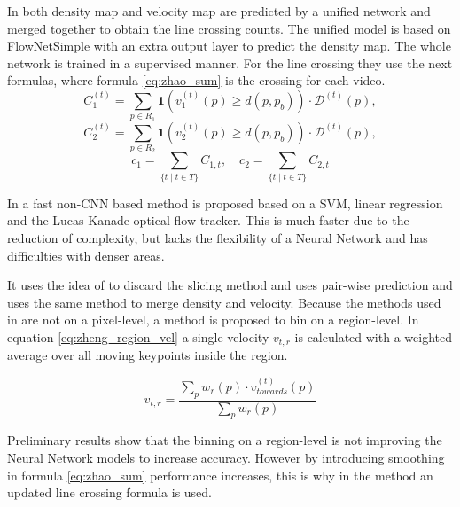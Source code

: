 In \cite{leibe_crossing-line_2016} both density map and velocity map are predicted by a unified network and merged together to obtain the line crossing counts. The unified model is based on FlowNetSimple \cite{Dosovitskiy2015} with an extra output layer to predict the density map. The whole network is trained in a supervised manner. For the line crossing they use the next formulas, where formula \ref{eq:zhao_sum} is the crossing for each video.
\begin{equation}
    C^{(t)}_{1} = \sum_{p \in R_{1}}\textbf{1}(v^{(t)}_{1}(p)\ge d(p,p_b)) \cdot \mathcal{D}^{(t)}(p),
\end{equation}
\begin{equation}
    C^{(t)}_{2} = \sum_{p \in R_{2}}\textbf{1}(v^{(t)}_{2}(p)\ge d(p,p_b)) \cdot \mathcal{D}^{(t)}(p),
\end{equation}
\begin{equation}
c_{1}=\sum_{\{t \mid t \in T\}} C_{1, t}, \quad c_{2}=\sum_{\{t \mid t \in T\}} C_{2, t}
\label{eq:zhao_sum}
\end{equation}


In \cite{zheng_cross-line_2019} a fast non-CNN based method is proposed based on a SVM, linear regression and the Lucas-Kanade optical flow tracker. This is much faster due to the reduction of complexity, but lacks the flexibility of a Neural Network and has difficulties with denser areas.

It uses the idea of \cite{leibe_crossing-line_2016} to discard the slicing method and uses pair-wise prediction and uses the same method to merge density and velocity. Because the methods used in \cite{zheng_cross-line_2019} are not on a pixel-level, a method is proposed to bin on a region-level. In equation \ref{eq:zheng_region_vel} a single velocity $v_{t,r}$ is calculated with a weighted average over all moving keypoints inside the region.

\begin{equation}
	v_{t,r} = \frac{\sum_p w_r(p) \cdot v^{(t)}_{towards}(p)}{\sum_p w_r(p)}
	\label{eq:zheng_region_vel}
\end{equation}

Preliminary results show that the binning on a region-level is not improving the Neural Network models to increase accuracy. However by introducing smoothing in formula \ref{eq:zhao_sum} performance increases, this is why in the method an updated line crossing formula is used.

